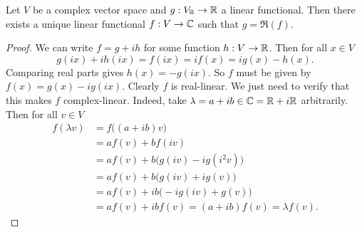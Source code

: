 \begin{lemma} \label{complexRangeExtensionRealFunctional}
Let $V$ be a complex vector space and $g: V_{\mathbb{R}}\to \mathbb{R}$ a linear functional. Then there exists a unique linear functional $f: V\to \mathbb{C}$ such that $g = \Re(f)$.
\end{lemma}
\begin{proof}
We can write $f = g + ih$ for some function $h: V\to \mathbb{R}$. Then for all $x\in V$
\[ g(ix)+ih(ix) = f(ix) = if(x) = ig(x) - h(x). \]
Comparing real parts gives $h(x) = - g(ix)$. So $f$ must be given by $f(x) = g(x) - ig(ix)$. Clearly $f$ is real-linear. We just need to verify that this makes $f$ complex-linear. Indeed, take $\lambda = a +ib \in \mathbb{C} = \mathbb{R}+i\mathbb{R}$ arbitrarily. Then for all $v\in V$
\begin{align*}
f(\lambda v) &= f\big((a+ib)v\big) \\
&= af(v) + bf(iv) \\
&= af(v) + b\big(g(iv) - ig(i^2v)\big) \\
&= af(v) + b\big(g(iv) + ig(v)\big) \\
&= af(v) + ib\big(-ig(iv) + g(v)\big) \\
&= af(v) + ibf(v) = (a+ib)f(v) = \lambda f(v).
\end{align*}
\end{proof}


